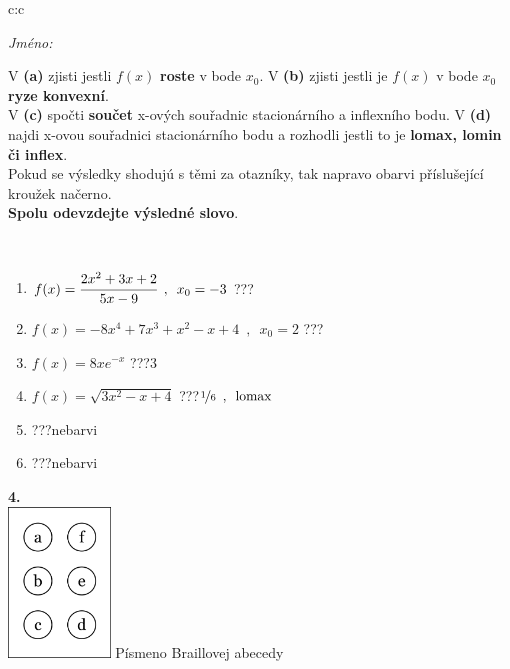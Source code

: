 \documentclass[10pt]{report}
\begin{document}
\begin{tabular}{c:c}
\begin{minipage}[c][104.5mm][t]{0.5\linewidth}
\begin{center}
\textit{Jméno:}\phantom{xxxxxxxxxxxxxxxxxxxxxxxxxxxxxxxxxxxxxxxxxxxxxxxxxxxxxxxxxxxxxxxxx}\\[5mm]
\begin{minipage}{0.95\linewidth}
\begin{center}
{\small V \textbf{(a)} zjisti jestli $f(x)$ \textbf{roste} v bode $x_0$. V \textbf{(b)} zjisti jestli je $f(x)$ v bode $x_0$ \textbf{ryze konvexní}.\\V \textbf{(c)} spočti \textbf{součet} x-ových souřadnic stacionárního a inflexního bodu. V \textbf{(d)} najdi x-ovou souřadnici stacionárního bodu a rozhodli jestli to je \textbf{lomax, lomin či inflex}.\\Pokud se výsledky shodujú s těmi za otazníky, tak napravo obarvi příslušející kroužek načerno.\\\textbf{Spolu odevzdejte výsledné slovo}}.
\end{center}
\end{minipage}
\\[1mm]
\begin{minipage}{0.79\linewidth}
\begin{center}
\begin{varwidth}{\linewidth}
\begin{enumerate}
\normalsize
\item $f(x)=\cfrac{2x^2+3x+2}{5x-9}\enspace , \enspace x_0=-3$\quad \dotfill\; ???\;\dotfill \quad {}
\item $f(x)=-8x^4+7x^3+x^2-x+4\enspace , \enspace x_0=2$\quad \dotfill\; ???\;\dotfill \quad {}
\item $f(x)=8xe^{-x}$\quad \dotfill\; ???\;\dotfill \quad $3$
\item $f(x)=\sqrt{3x^2-x+4}$\quad \dotfill\; ???\;\dotfill \quad $\nicefrac{1}{6}\enspace , \enspace\mathrm{lomax}$
\item \quad \dotfill\; ???\;\dotfill \quad nebarvi
\item \quad \dotfill\; ???\;\dotfill \quad nebarvi
\end{enumerate}
\end{varwidth}
\end{center}
\end{minipage}
\begin{minipage}{0.20\linewidth}
\begin{center}
{\Huge\bfseries 4.} \\[2mm]
\includegraphics[height=40mm]{../images/braille.png}
{\small Písmeno Braillovej abecedy}
\end{center}
\end{minipage}
\end{center}
\end{minipage}
%
\end{tabular}
\end{document}
